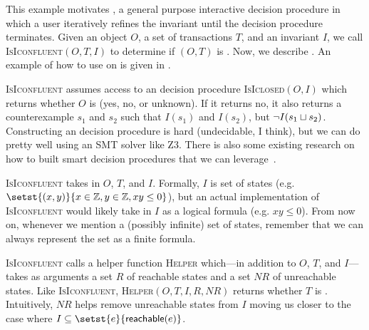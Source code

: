 \newcommand{\IsIconfluent}{\textsc{IsIconfluent}}
\newcommand{\IsIclosed}{\textsc{IsIclosed}}
\newcommand{\Helper}{\textsc{Helper}}

This example motivates , a general
purpose interactive \Iconfluence{} decision procedure in which a user
iteratively refines the invariant until the decision procedure terminates.
Given an object $O$, a set of transactions $T$, and an invariant $I$, we call
\IsIconfluent$(O, T, I)$ to determine if $(O, T)$ is \Iconfluent{}. Now, we
describe .  An example of how to use
 on 
is given in .

\IsIconfluent{} assumes access to an \Iclosed{} decision procedure
\IsIclosed$(O, I)$ which returns whether $O$ is \Iclosed{} (yes, no, or
unknown). If it returns no, it also returns a counterexample $s_1$ and $s_2$
such that $I(s_1)$ and $I(s_2)$, but $\lnot I(s_1 \sqcup s_2)$. Constructing an
\Iclosed{} decision procedure is hard (undecidable, I think), but we can do
pretty well using an SMT solver like Z3. There is also some existing research
on how to built smart \Iclosed{} decision procedures that we can
leverage~\cite{li2014automating}.

\IsIconfluent{} takes in $O$, $T$, and $I$. Formally, $I$ is set of states
(e.g. $\setst{(x, y)}{x \in \ints, y \in \ints, xy \leq 0}$), but an actual
implementation of \IsIconfluent{} would likely take in $I$ as a logical formula
(e.g. $xy \leq 0$). From now on, whenever we mention a (possibly infinite) set
of states, remember that we can always represent the set as a finite formula.

\IsIconfluent{} calls a helper function \Helper{} which---in addition to $O$,
$T$, and $I$---takes as arguments a set $R$ of reachable states and a set $NR$
of unreachable states. Like \IsIconfluent, \Helper$(O, T, I, R, NR)$ returns
whether $T$ is \Iconfluent. Intuitively, $NR$ helps remove unreachable states
from $I$ moving us closer to the case where $I \subseteq
\setst{e}{\reachable{e}}$.


